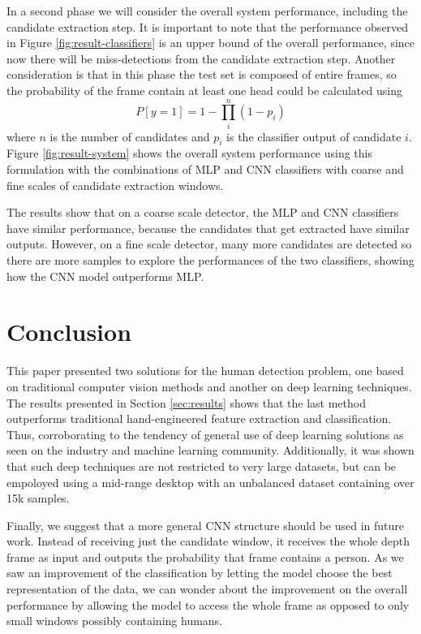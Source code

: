     In a second phase we will consider the overall system performance, including the candidate extraction step. It is important to note that the performance observed in Figure \ref{fig:result-classifiers} is an upper bound of the overall performance, since now there will be miss-detections from the candidate extraction step. Another consideration is that in this phase the test set is composed of entire frames, so the probability of the frame contain at least one head could be calculated using
    \begin{equation}
    P[y=1] = 1 - \prod_i^n (1-p_i)
    \end{equation}
    where $n$ is the number of candidates and $p_i$ is the classifier output of candidate $i$. Figure \ref{fig:result-system} shows the overall system performance using this formulation with the combinations of MLP and CNN classifiers with coarse and fine scales of candidate extraction windows.

    The results show that on a coarse scale detector, the MLP and CNN classifiers have similar performance, because the candidates that get extracted have similar outputs. However, on a fine scale detector, many more candidates are detected so there are more samples to explore the performances of the two classifiers, showing how the CNN model outperforms MLP.

    \begin{figure*}[!t]
    \centering
    \label{fig:result-system-all}
    \hfil
    \label{fig:result-system-all-zoom}
    \caption{Overall system performance.}
    \label{fig:result-system}
    \end{figure*}

\section{Conclusion}
\label{sec:conclusion}

    This paper presented two solutions for the human detection problem, one based on traditional computer vision methods and another on deep learning techniques. The results presented in Section \ref{sec:results} shows that the last method outperforms traditional hand-engineered feature extraction and classification. Thus, corroborating to the tendency of general use of deep learning solutions as seen on the industry and machine learning community. Additionally, it was shown that such deep techniques are not restricted to very large datasets, but can be empoloyed using a mid-range desktop with an unbalanced dataset containing over 15k samples.

    Finally, we suggest that a more general CNN structure should be used in future work. Instead of receiving just the candidate window, it receives the whole depth frame as input and outputs the probability that frame contains a person. As we saw an improvement of the classification by letting the model choose the best representation of the data, we can wonder about the improvement on the overall performance by allowing the model to access the whole frame as opposed to only small windows possibly containing humans.
